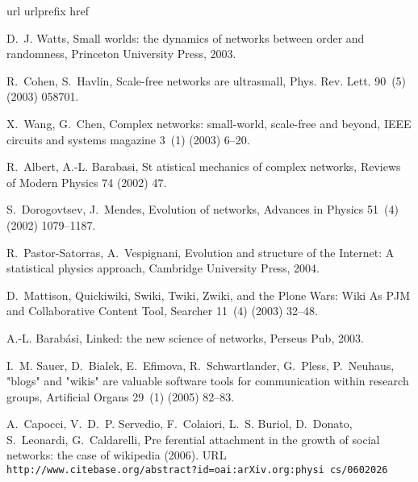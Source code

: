 \documentclass{elsarticle}
\begin{document}

% 

\begin{thebibliography}{10}
\expandafter\ifx\csname url\endcsname\relax
  \def\url#1{\texttt{#1}}\fi
\expandafter\ifx\csname urlprefix\endcsname\relax\def\urlprefix{URL }\fi
\expandafter\ifx\csname href\endcsname\relax
  \def\href#1#2{#2} \def\path#1{#1}\fi

D.~J. Watts, Small worlds: the dynamics of networks between order and
  randomness, Princeton University Press, 2003.

R.~Cohen, S.~Havlin, Scale-free networks are ultrasmall, Phys. Rev. Lett.
  90~(5) (2003) 058701.


X.~Wang, G.~Chen, Complex networks: small-world, scale-free and beyond, IEEE
  circuits and systems magazine 3~(1) (2003) 6--20.

R.~Albert, A.-L. Barabasi,
 {St%
atistical mechanics of complex networks}, Reviews of Modern Physics 74 (2002)
  47.


S.~Dorogovtsev, J.~Mendes, {Evolution of networks}, Advances in Physics 51~(4)
  (2002) 1079--1187.

R.~Pastor-Satorras, A.~Vespignani, {Evolution and structure of the Internet: A
  statistical physics approach}, Cambridge University Press, 2004.

D.~Mattison, {Quickiwiki, Swiki, Twiki, Zwiki, and the Plone Wars: Wiki As PJM
  and Collaborative Content Tool}, Searcher 11~(4) (2003) 32--48.

A.-L. Barabási, Linked: the new science of networks, Perseus Pub, 2003.

I.~M. Sauer, D.~Bialek, E.~Efimova, R.~Schwartlander, G.~Pless, P.~Neuhaus,
  "blogs" and "wikis" are valuable software tools for communication within
  research groups, Artificial Organs 29~(1) (2005) 82--83.

A.~Capocci, V.~D.~P. Servedio, F.~Colaiori, L.~S. Buriol, D.~Donato,
  S.~Leonardi, G.~Caldarelli,
 {Pre%
ferential attachment in the growth of social networks: the case of wikipedia}
  (2006).
\newline\urlprefix\url{http://www.citebase.org/abstract?id=oai:arXiv.org:physi%
cs/0602026}


\end{thebibliography}
\end{document}
